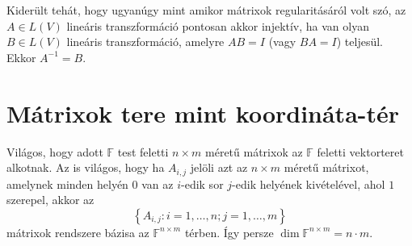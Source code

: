 \documentclass[9pt, a4paper, showtrims]{memoir}
\theoremstyle{plain}
\theoremstyle{remark}
\theoremstyle{definition}
\begin{document}
Kiderült tehát, hogy ugyanúgy mint amikor mátrixok regularitásáról volt szó, 
az $A\in L\left( V \right)$ lineáris transzformáció pontosan akkor injektív, 
ha van olyan $B\in L\left( V \right)$ lineáris transzformáció, 
amelyre $AB=I$ (vagy $BA=I$) teljesül.
Ekkor $A^{-1}=B$.

\section{Mátrixok tere mint koordináta-tér}
Világos, hogy adott $\mathbb{F}$ test feletti $n\times m$ méretű mátrixok az $\mathbb{F}$ feletti
vektorteret alkotnak.
Az is világos, hogy ha $A_{i,j}$ jelöli azt az $n\times m$ méretű mátrixot,
amelynek minden helyén $0$ van az $i$-edik sor $j$-edik helyének kivételével, ahol $1$ szerepel,
akkor az 
\[
    \left\{ A_{i,j}:i=1,\dots,n;j=1,\dots,m\right\}
\]
mátrixok rendszere bázisa az $\mathbb{F}^{n\times m}$ térben.
Így persze $\dim \mathbb{F}^{n\times m} = n\cdot m$.
\end{document}

